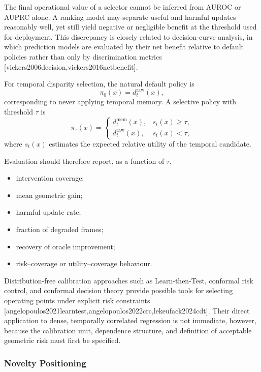 \documentclass[11pt,a4paper]{article}
\providecommand{\citep}[1]{[#1]}
\begin{document}
The final operational value of a selector cannot be inferred from AUROC or AUPRC alone. A ranking model may separate useful and harmful updates reasonably well, yet still yield negative or negligible benefit at the threshold used for deployment. This discrepancy is closely related to decision-curve analysis, in which prediction models are evaluated by their net benefit relative to default policies rather than only by discrimination metrics \citep{vickers2006decision,vickers2016netbenefit}.

For temporal disparity selection, the natural default policy is
\begin{equation}
    \pi_0(x) = d_t^{\mathrm{raw}}(x),
\end{equation}
corresponding to never applying temporal memory. A selective policy with threshold \(\tau\) is
\begin{equation}
    \pi_{\tau}(x)
    =
    \begin{cases}
        d_t^{\mathrm{mem}}(x), & s_t(x) \geq \tau,\\
        d_t^{\mathrm{raw}}(x), & s_t(x) < \tau,
    \end{cases}
\end{equation}
where \(s_t(x)\) estimates the expected relative utility of the temporal candidate.

Evaluation should therefore report, as a function of \(\tau\),
\begin{itemize}
    \item intervention coverage;
    \item mean geometric gain;
    \item harmful-update rate;
    \item fraction of degraded frames;
    \item recovery of oracle improvement;
    \item risk--coverage or utility--coverage behaviour.
\end{itemize}

Distribution-free calibration approaches such as Learn-then-Test, conformal risk control, and conformal decision theory provide possible tools for selecting operating points under explicit risk constraints \citep{angelopoulos2021learntest,angelopoulos2022crc,lekeufack2024cdt}. Their direct application to dense, temporally correlated regression is not immediate, however, because the calibration unit, dependence structure, and definition of acceptable geometric risk must first be specified.

\subsubsection{Novelty Positioning}
\end{document}
